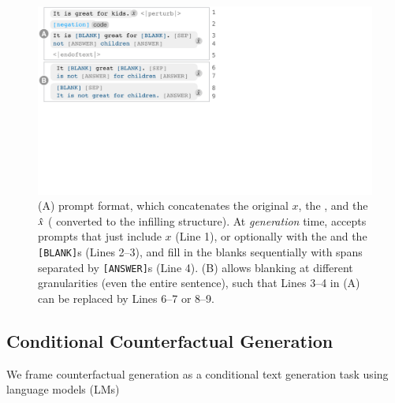 \begin{figure}[t]
\centering
\includegraphics[trim={0 18.6cm 31.5cm 0cm}, clip, width=1\columnwidth]{figures/blank.pdf}
\vspace{-15pt}
\caption{ 
(A) \sysname prompt format, which concatenates the original $x$, the \tagstr, and the $\hat{x}$ ( converted to the infilling structure).
At \emph{generation} time, \sysname accepts prompts that just include $x$ (Line 1), or optionally with the \tagstrshort and the \texttt{[BLANK]}s (Lines 2--3), and fill in the blanks sequentially with spans separated by \texttt{[ANSWER]}s (Line 4).
(B) \sysname allows blanking at different granularities (even the entire sentence), such that Lines 3--4 in (A) can be replaced by Lines 6--7 or 8--9. 
}
\vspace{-10pt}
\label{fig:blank}
\end{figure}


\subsection{Conditional Counterfactual Generation}
\label{subsec:nlg}




We frame counterfactual generation as a conditional text generation task using language models (LMs)


